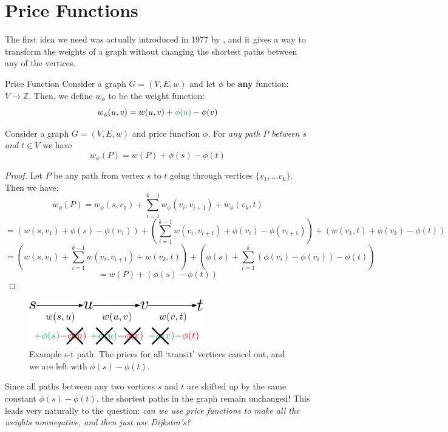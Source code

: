 \documentclass[11pt]{article}
\begin{document}
\section{Price Functions}
\label{sec:price}
The first idea we need was actually introduced in 1977 by \cite{Johnson77}, and it gives a way to transform the weights of a graph
without changing the shortest paths between any of the vertices.

\begin{definition}{Price Function}
   Consider a graph $G = (V,E,w)$ and let $\phi$ be \textbf{any} function: $V \rightarrow \mathbb{Z}$. Then, we define $w_\phi$ to be the weight function: $$w_\phi(u,v) = w(u,v) + \textcolor{ForestGreen}{\phi(u)} - \textcolor{black}{\phi(v)}$$ %
\end{definition}

\begin{lemma}
Consider a graph $G = (V,E,w)$ and price function $\phi$. For \textit{any path $P$ between $s$ and $t \in V$} we have 
$$w_\phi(P) = w(P) + \phi(s) - \phi(t)$$
\end{lemma}

\begin{proof}
    Let $P$ be any path from vertex $s$ to $t$ going through vertices $\{v_1, \ldots v_k\}$. Then we have:
    $$w_\phi(P) = w_{\phi}(s, v_1) + \sum_{i = 1}^{k-1}w_{\phi}(v_i, v_{i + 1}) + w_{\phi}(v_k, t)$$
    $$ =  \left(w(s, v_1) + \phi(s) - \phi(v_1) \right) + \left(\sum_{i = 1}^{k-1} w(v_i, v_{i + 1}) + \phi(v_i) - \phi(v_{i + 1}) \right) + \left(w(v_k, t) + \phi(v_k) - \phi(t) \right)$$
    $$ =  \left(w(s, v_1) + \sum_{i = 1}^{k-1} w(v_i, v_{i + 1}) + w(v_k, t) \right) + \left(\phi(s) + \sum_{i = 1}^{k}(\phi(v_i) - \phi(v_i)) - \phi(t) \right)  $$
    $$ = w(P) + \left(\phi(s) - \phi(t) \right)$$
\end{proof}

\begin{figure}[ht]
    \centering
    \includegraphics[height=2cm]{images/price2.pdf}
    \caption{Example s-t path. The prices for all `transit' vertices cancel out, and we are left with $\phi(s) - \phi(t)$.}
    \label{fig:price}
\end{figure}
Since all paths between any two vertices $s$ and $t$ are shifted up by the same constant $\phi(s) - \phi(t)$, the shortest paths in the graph remain unchanged! This leads very naturally to the question: \emph{can we use price functions to make all the weights nonnegative, and then just use Dijkstra's?}
\end{document}
